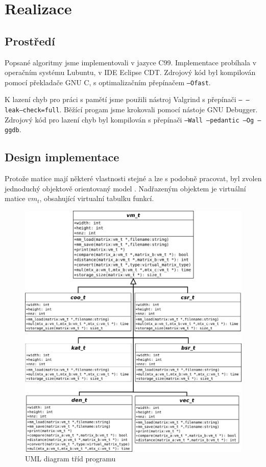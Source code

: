 \chapter{Realizace}

\section{Prostředí}

Popsané algoritmy jsme implementovali v jazyce C99. Implementace probíhala v operačním systému Lubuntu, v IDE Eclipse CDT. Zdrojový kód byl kompilován pomocí překladače GNU C, s optimalizačním přepínačem \texttt{--Ofast}.

K lazení chyb pro práci s pamětí jsme použili nástroj Valgrind s přepínači \texttt{-- --leak--check=full}. Běžící progam jsme krokovali pomocí nástoje GNU Debugger. Zdrojový kód pro lazení chyb byl kompilován s přepínači \texttt{--Wall --pedantic --Og --ggdb}.


\section{Design implementace}

Protože matice mají některé vlastnosti stejné a lze s podobně pracovat, byl zvolen jednoduchý objektově orientovaný model \cite{schreiner1994objektorientierte}. Nadřazeným objektem je virtuální matice $vm_t$, obsahující virtualní tabulku funkcí.
	
\begin{figure}[H]
	\includegraphics[width=1.0\textwidth]{./images/uml/uml}
	\caption{UML diagram tříd programu}
	\label{fig:uml}
\end{figure}

